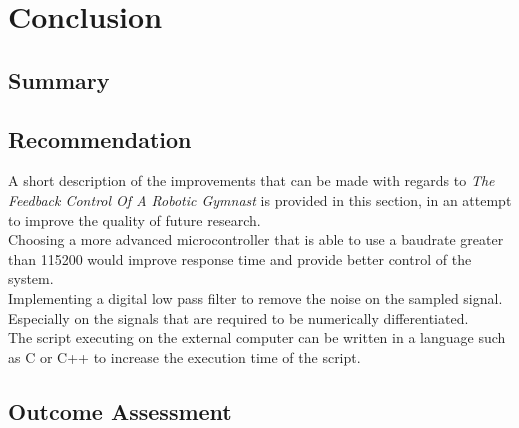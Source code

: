 \chapter{Conclusion}
\label{chp:conclusion}



\section{Summary}

\section{Recommendation}
A short description of the improvements that can be made with regards to \textit{The Feedback Control Of A Robotic Gymnast} is provided in this section, in an attempt to improve the quality of future research.\\

Choosing a more advanced microcontroller that is able to use a baudrate greater than 115200 would improve response time and provide better control of the system.\\

Implementing a digital low pass filter to remove the noise on the sampled signal. Especially on the signals that are required to be numerically differentiated.\\

The script executing on the external computer can be written in a language such as C or C++ to increase the execution time of the script.\\

\newpage
\section{Outcome Assessment}


